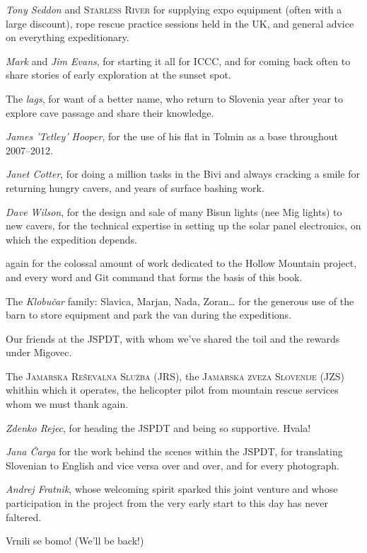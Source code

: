 \begin{citemize}
\item \textit{Tony Seddon} and \textsc{Starless River} for supplying expo equipment (often with a large discount), rope rescue practice sessions held in the UK, and general advice on everything expeditionary.

\item \textit{Mark} and \textit{Jim Evans}, for starting it all for ICCC, and for coming back often to share stories of early exploration at the sunset spot.
\item The \textit{lags}, for want of a better name, who return to Slovenia year after year to explore cave passage and share their knowledge.
\item \textit{James 'Tetley' Hooper}, for the use of his flat in Tolmin as a base throughout 2007--2012.
\item \textit{Janet Cotter}, for doing a million tasks in the Bivi and always cracking a smile for returning hungry cavers, and years of surface bashing work. 
\item \textit{Dave Wilson}, for the design and sale of many Bisun lights (nee Mig lights) to new cavers, for the technical expertise in setting up the solar panel electronics, on which the expedition depends.


\item {} again for the colossal amount of work dedicated to the Hollow Mountain project, and every word and Git command that forms the basis of this book. 


\item The \textit{Klobu\v{c}ar} family: Slavica, Marjan, Nada, Zoran\ldots{} for the generous use of the barn to store equipment and park the van during the expeditions.

\item Our friends at the JSPDT, with whom we've shared the toil and the rewards under Migovec.
\item The \textsc{Jamarska Re\v{s}evalna Slu\v{z}ba} (JRS), the \textsc{Jamarska zveza Slovenije} (JZS) whithin which it operates, the helicopter pilot from mountain rescue services whom we must thank again.
\item \textit{Zdenko Rejec}, for heading the JSPDT and being so supportive. Hvala!
\item \textit{Jana \v{C}arga} for the work behind the scenes within the JSPDT, for translating Slovenian to English and vice versa over and over, and for every photograph.
\item \textit{Andrej Fratnik}, whose welcoming spirit sparked this joint venture and whose participation in the project from the very early start to this day has never faltered. 
\end{citemize}


Vrnili se bomo! (We'll be back!)